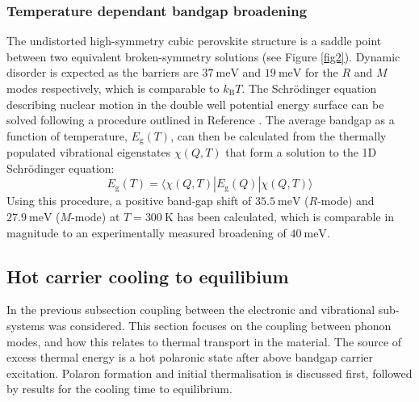 
\subsubsection{Temperature dependant bandgap broadening} \label{ch5coupling}

The undistorted high-symmetry cubic perovskite structure is a saddle point between two equivalent broken-symmetry solutions (see Figure \ref{fig2}). Dynamic disorder is expected as the barriers are $37\ \textrm{meV}$ and $19\ \textrm{meV}$ for the $R$ and $M$ modes respectively, which is comparable to $k_\mathrm{B}T$. 
The Schr\"{o}dinger equation describing nuclear motion in the double well potential energy surface can be solved following a procedure outlined in Reference \cite{Skelton2016a}. 
The average bandgap as a function of temperature, $E_\mathrm{g}(T)$, can then be calculated from the thermally populated vibrational eigenstates $\chi(Q,T)$ that form a solution to the 1D Schr\"{o}dinger equation:
\begin{equation}
E_\mathrm{g}(T) = \langle \chi(Q,T)|E_\mathrm{g}(Q)|\chi(Q,T) \rangle
\end{equation}
Using this procedure, a positive band-gap shift of $35.5\ \textrm{meV}$ ($R$-mode) and $27.9\ \textrm{meV}$ ($M$-mode) at $T=300\ \textrm{K}$ has been calculated, which is comparable in magnitude to an experimentally measured broadening of $40\ \textrm{meV}$.\autocite{Wright2016} 

\subsection{Hot carrier cooling to equilibium} \label{ch5:epcoupling}
In the previous subsection coupling between the electronic and vibrational sub-systems was considered. This section focuses on the coupling between phonon modes, and how this relates to thermal transport in the material. The source of excess thermal energy is a hot polaronic state after above bandgap carrier excitation. Polaron formation and initial thermalisation is discussed first, followed by results for the cooling time to equilibrium.

